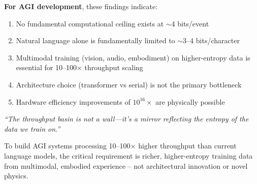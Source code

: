 \documentclass[11pt,a4paper]{article}
\begin{document}
\textbf{For AGI development}, these findings indicate:
\begin{enumerate}
\item No fundamental computational ceiling exists at $\sim$4 bits/event
\item Natural language alone is fundamentally limited to $\sim$3--4 bits/character
\item Multimodal training (vision, audio, embodiment) on higher-entropy data is essential for 10--100$\times$ throughput scaling
\item Architecture choice (transformer vs serial) is not the primary bottleneck
\item Hardware efficiency improvements of $10^{16}\times$ are physically possible
\end{enumerate}

\textit{``The throughput basin is not a wall---it's a mirror reflecting the entropy of the data we train on.''}

To build AGI systems processing 10--100$\times$ higher throughput than current language models, the critical requirement is richer, higher-entropy training data from multimodal, embodied experience -- not architectural innovation or novel physics.
\end{document}
